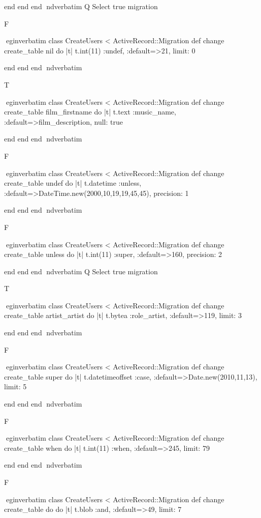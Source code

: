     end 
  end 
end
nd{verbatim}
Q
 Select true migration

F

egin{verbatim}
 class CreateUsers < ActiveRecord::Migration 
  def change 
    create_table nil do |t| 
      t.int(11) :undef, :default=>21, limit: 0
    
    end 
  end 
end
nd{verbatim}

T

egin{verbatim}
 class CreateUsers < ActiveRecord::Migration 
  def change 
    create_table film_firstname do |t| 
      t.text :music_name, :default=>film_description, null: true
    
    end 
  end 
end
nd{verbatim}

F

egin{verbatim}
 class CreateUsers < ActiveRecord::Migration 
  def change 
    create_table undef do |t| 
      t.datetime :unless, :default=>DateTime.new(2000,10,19,19,45,45), precision: 1
    
    end 
  end 
end
nd{verbatim}

F

egin{verbatim}
 class CreateUsers < ActiveRecord::Migration 
  def change 
    create_table unless do |t| 
      t.int(11) :super, :default=>160, precision: 2
    
    end 
  end 
end
nd{verbatim}
Q
 Select true migration

T

egin{verbatim}
 class CreateUsers < ActiveRecord::Migration 
  def change 
    create_table artist_artist do |t| 
      t.bytea :role_artist, :default=>119, limit: 3
    
    end 
  end 
end
nd{verbatim}

F

egin{verbatim}
 class CreateUsers < ActiveRecord::Migration 
  def change 
    create_table super do |t| 
      t.datetimeoffset :case, :default=>Date.new(2010,11,13), limit: 5
    
    end 
  end 
end
nd{verbatim}

F

egin{verbatim}
 class CreateUsers < ActiveRecord::Migration 
  def change 
    create_table when do |t| 
      t.int(11) :when, :default=>245, limit: 79
    
    end 
  end 
end
nd{verbatim}

F

egin{verbatim}
 class CreateUsers < ActiveRecord::Migration 
  def change 
    create_table do do |t| 
      t.blob :and, :default=>49, limit: 7
    
